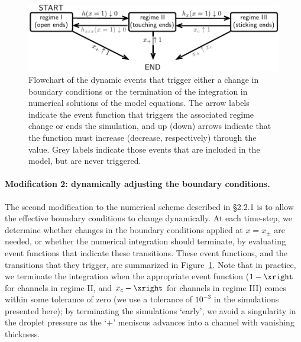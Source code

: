 \begin{figure}[t]
\centering
\includegraphics[scale=0.9]{geometric_numerics_events}
\caption{Flowchart of the dynamic events that trigger either a change in boundary conditions or the termination of the integration in numerical solutions of the model equations. The arrow labels indicate the event function that triggers the associated regime change or ends the simulation, and up (down) arrows indicate that the function must increase (decrease, respectively) through the value. Grey labels indicate those events that are included in the model, but are never triggered.}\label{fig:Ch4:Geometric:Flowchart}
\end{figure}

\paragraph{Modification 2: dynamically adjusting the boundary conditions.} The second  modification to the numerical scheme described in \S2.2.1 is to allow the effective boundary conditions to change dynamically. At each time-step, we determine whether changes in the boundary conditions applied at $x = x_{\pm}$ are needed, or whether the numerical integration should terminate, by evaluating event functions that indicate these transitions. These event functions, and the transitions that they trigger, are summarized in Figure~\ref{fig:Ch4:Geometric:Flowchart}. Note that in practice, we terminate the integration when the appropriate event function ($1 - \xright$ for channels in regime II, and $x_c - \xright $ for channels in regime III) comes within some tolerance of zero (we use a tolerance of $10^{-3}$ in the simulations presented here); by terminating the simulations `early', we avoid a singularity in the droplet pressure as the `$+$' meniscus advances into a channel with vanishing thickness.


